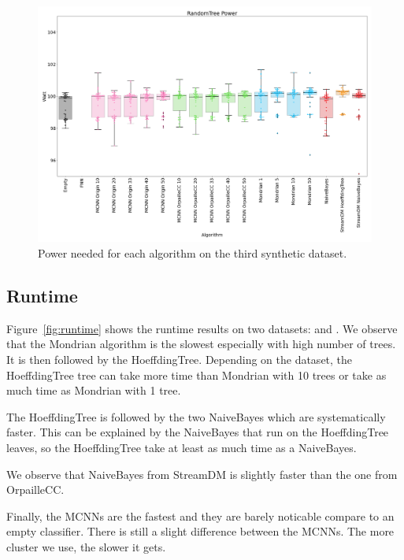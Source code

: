 \begin{figure}[H]
	\includegraphics[width=\linewidth]{figures/results/dataset_3_watt.png}
	\caption{Power needed for each algorithm on the third synthetic dataset.}
\end{figure}

\subsection{Runtime}
Figure~\ref{fig:runtime} shows the runtime results on two datasets:
\banosdataset and \recofitdataset. We observe that the Mondrian algorithm is
the slowest especially with high number of trees.
It is then followed by the HoeffdingTree. Depending on the dataset, the
HoeffdingTree tree can take more time than Mondrian with 10 trees or take as
much time as Mondrian with 1 tree.

The HoeffdingTree is followed by the two NaiveBayes which are systematically
faster.  This can be explained by the NaiveBayes that run on the HoeffdingTree
leaves, so the HoeffdingTree take at least as much time as a NaiveBayes.

We observe that NaiveBayes from StreamDM is slightly faster than the one from
OrpailleCC.

Finally, the MCNNs are the fastest and they are barely noticable compare to an
empty classifier. There is still a slight difference between the MCNNs. The
more cluster we use, the slower it gets.

